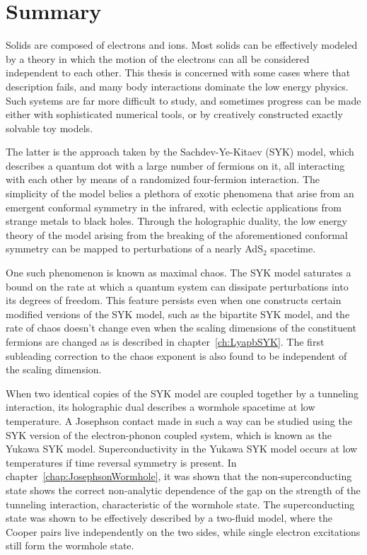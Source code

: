 \newpage
\thispagestyle{empty}

\chapter*{Summary}
\label{Summary}

Solids are composed of electrons and ions. Most solids can be effectively modeled by a theory in which the motion of the electrons can all be considered independent to each other. This thesis is concerned with some cases where that description fails, and many body interactions dominate the low energy physics. Such systems are far more difficult to study, and sometimes progress can be made either with sophisticated numerical tools, or by creatively constructed exactly solvable toy models.
\par
The latter is the approach taken by the Sachdev-Ye-Kitaev (SYK) model, which describes a quantum dot with a large number of fermions on it, all interacting with each other by means of a randomized four-fermion interaction. The simplicity of the model belies a plethora of exotic phenomena that arise from an emergent conformal symmetry in the infrared, with eclectic applications from strange metals to black holes. Through the holographic duality, the low energy theory of the model arising from the breaking of the aforementioned conformal symmetry can be mapped to perturbations of a nearly AdS${}_2$ spacetime. 
\par
One such phenomenon is known as maximal chaos. The SYK model saturates a bound on the rate at which a quantum system can dissipate perturbations into its degrees of freedom. This feature persists even when one constructs certain modified versions of the SYK model, such as the bipartite SYK model, and the rate of chaos doesn't change even when the scaling dimensions of the constituent fermions are changed as is described in chapter~\ref{ch:LyapbSYK}. The first subleading correction to the chaos exponent is also found to be independent of the scaling dimension. 
\par
When two identical copies of the SYK model are coupled together by a tunneling interaction, its holographic dual describes a wormhole spacetime at low temperature. A Josephson contact made in such a way can be studied using the SYK version of the electron-phonon coupled system, which is known as the Yukawa SYK model. Superconductivity in the Yukawa SYK model occurs at low temperatures if time reversal symmetry is present. In chapter~\ref{chap:JosephsonWormhole}, it was shown that the non-superconducting state shows the correct non-analytic dependence of the gap on the strength of the tunneling interaction, characteristic of the wormhole state. The superconducting state was shown to be effectively described by a two-fluid model, where the Cooper pairs live independently on the two sides, while single electron excitations still form the wormhole state. 
